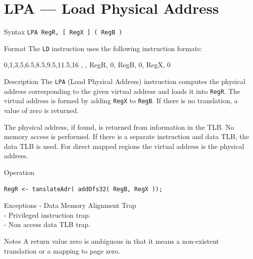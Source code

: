 %
%
\pagebreak
\section*{LPA — Load Physical Address}

\begin{iPageDescEntry}{Syntax}
    \texttt{LPA RegR, [ RegX ] ( RegB )}
\end{iPageDescEntry}

\begin{iPageDescEntry}{Format}
    The \texttt{LD} instruction uses the following instruction formats: \\

    \begin{flushleft}
    \drawInstrFormat
        {0,1,3,5,6.5,8.5,9.5,11.5,16}
        {\OpCodeGrpSYS, \OpCodeLPA, RegR, 0, RegB, 0, RegX, 0}
    \end{flushleft}
\end{iPageDescEntry}

\begin{iPageDescEntry}{Description}
    The \texttt{LPA} (Load Physical Address) instruction computes the physical 
    address corresponding to the given virtual address and loads it into \texttt{RegR}. The virtual address is formed by adding \texttt{RegX} to \texttt{RegB}. If there is no translation, a value of zero is returned. 

    The physical address, if found, is returned from information in the TLB.  No memory access is performed. If there is a separate instruction and data TLB, the data TLB is used. For direct mapped regions the virtual address is the physical address.
    
\end{iPageDescEntry}

\begin{iPageDescOpEntry}{Operation}
\begin{lstlisting}[style=iPageOpStyle]
RegR <- tanslateAdr( addOfs32( RegB, RegX ));
\end{lstlisting}
\end{iPageDescOpEntry}

\begin{iPageDescEntry}{Exceptions}
	- Data Memory Alignment Trap \\
    - Privileged instruction trap. \\
    - Non access data TLB trap.
\end{iPageDescEntry}

\begin{iPageDescEntry}{Notes}
A return value zero is ambiguous in that it means a non-existent translation or a mapping to page zero.    
\end{iPageDescEntry}
